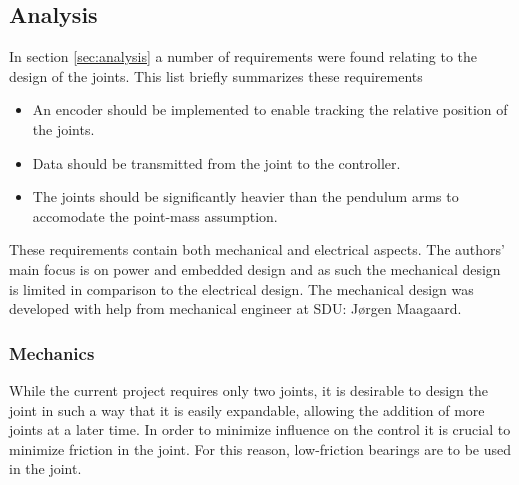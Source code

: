 \subsection{Analysis} %
\label{sub:analysis}

In section \ref{sec:analysis} a number of requirements were found relating to the design of the joints.
This list briefly summarizes these requirements

\begin{itemize}
	\item An encoder should be implemented to enable tracking the relative position of the joints.
	\item Data should be transmitted from the joint to the controller.
	\item The joints should be significantly heavier than the pendulum arms to accomodate the point-mass assumption. 
\end{itemize}

These requirements contain both mechanical and electrical aspects.
The authors' main focus is on power and embedded design and as such the mechanical design is limited in comparison to the electrical design.
The mechanical design was developed with help from mechanical engineer at SDU: Jørgen Maagaard.

\subsubsection{Mechanics} %
\label{ssub:mechanics}
While the current project requires only two joints, it is desirable to design the joint in such a way that it is easily expandable, allowing the addition of more joints at a later time.
In order to minimize influence on the control it is crucial to minimize friction in the joint.
For this reason, low-friction bearings are to be used in the joint.

